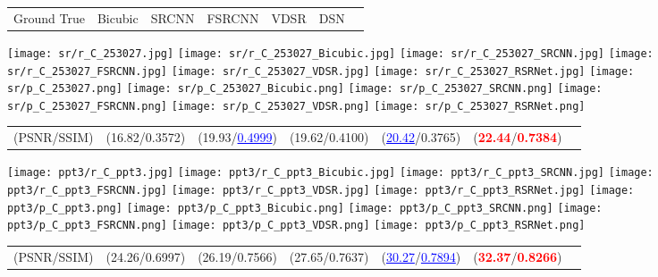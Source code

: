 \documentclass[runningheads]{llncs}
\begin{document}
\begin{figure}[h]
\center
\scriptsize
\begin{tabular}{C{1.925cm}C{1.925cm}C{1.925cm}C{1.925cm}C{1.925cm}C{1.925cm}c}
Ground True&Bicubic&SRCNN \cite{srcnn_pami}&FSRCNN \cite{fsrcnn}&VDSR \cite{vdsr}&DSN&
\end{tabular}
\texttt{[image: sr/r\_C\_253027.jpg]}
\texttt{[image: sr/r\_C\_253027\_Bicubic.jpg]}
\texttt{[image: sr/r\_C\_253027\_SRCNN.jpg]}
\texttt{[image: sr/r\_C\_253027\_FSRCNN.jpg]}
\texttt{[image: sr/r\_C\_253027\_VDSR.jpg]}
\texttt{[image: sr/r\_C\_253027\_RSRNet.jpg]}
\texttt{[image: sr/p\_C\_253027.png]}
\texttt{[image: sr/p\_C\_253027\_Bicubic.png]}
\texttt{[image: sr/p\_C\_253027\_SRCNN.png]}
\texttt{[image: sr/p\_C\_253027\_FSRCNN.png]}
\texttt{[image: sr/p\_C\_253027\_VDSR.png]}
\texttt{[image: sr/p\_C\_253027\_RSRNet.png]}
\begin{tabular}{C{1.925cm}C{1.925cm}C{1.925cm}C{1.925cm}C{1.925cm}C{1.925cm}c}
(PSNR/SSIM)&(16.82/0.3572)&(19.93/\textcolor{blue}{\underline{0.4999}})&(19.62/0.4100)&(\textcolor{blue}{\underline{20.42}}/0.3765)&(\textcolor{red}{\textbf{22.44}}/\textcolor{red}{\textbf{0.7384}})&
\end{tabular}
\texttt{[image: ppt3/r\_C\_ppt3.jpg]}
\texttt{[image: ppt3/r\_C\_ppt3\_Bicubic.jpg]}
\texttt{[image: ppt3/r\_C\_ppt3\_SRCNN.jpg]}
\texttt{[image: ppt3/r\_C\_ppt3\_FSRCNN.jpg]}
\texttt{[image: ppt3/r\_C\_ppt3\_VDSR.jpg]}
\texttt{[image: ppt3/r\_C\_ppt3\_RSRNet.jpg]}
\texttt{[image: ppt3/p\_C\_ppt3.png]}
\texttt{[image: ppt3/p\_C\_ppt3\_Bicubic.png]}
\texttt{[image: ppt3/p\_C\_ppt3\_SRCNN.png]}
\texttt{[image: ppt3/p\_C\_ppt3\_FSRCNN.png]}
\texttt{[image: ppt3/p\_C\_ppt3\_VDSR.png]}
\texttt{[image: ppt3/p\_C\_ppt3\_RSRNet.png]}
\begin{tabular}{C{1.925cm}C{1.925cm}C{1.925cm}C{1.925cm}C{1.925cm}C{1.925cm}c}
(PSNR/SSIM)&(24.26/0.6997)&(26.19/0.7566)&(27.65/0.7637)&(\textcolor{blue}{\underline{30.27}}/\textcolor{blue}{\underline{0.7894}})&(\textcolor{red}{\textbf{32.37}}/\textcolor{red}{\textbf{0.8266}})&
\end{tabular}

\end{figure}
\end{document}
